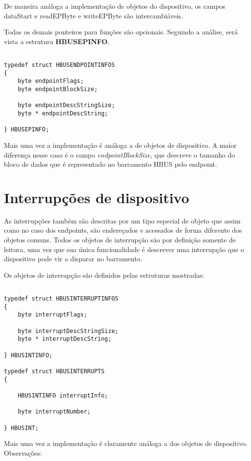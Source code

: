De maneira análoga a implementação de objetos do dispositivo, os campos dataStart e readEPByte e writeEPByte são intercambiáveis.

Todas os demais ponteiros para funções são opcionais. Seguindo a análise, será vista a estrutura \textbf{HBUSEPINFO}.

\begin{verbatim}

typedef struct HBUSENDPOINTINFOS
{
	byte endpointFlags;
	byte endpointBlockSize;
	
	byte endpointDescStringSize;
	byte * endpointDescString;
	
} HBUSEPINFO;

\end{verbatim}

Mais uma vez a implementação é análoga a de objetos de dispositivo. A maior diferença nesse caso é o campo \textit{endpointBlockSize}, que descreve o tamanho do bloco de dados que é representado no barramento HBUS pelo endpoint.

\section{Interrupções de dispositivo}

As interrupções também são descritas por um tipo especial de objeto que assim como no caso dos endpoints, são endereçados e acessados de forma diferente dos objetos comuns. Todos os objetos de interrupção são por definição somente de leitura, uma vez que sua única funcionalidade é descrever uma interrupção que o dispositivo pode vir a disparar no barramento.

Os objetos de interrupção são definidos pelas estruturas mostradas:

\begin{verbatim}

typedef struct HBUSINTERRUPTINFOS
{
	byte interruptFlags;
	
	byte interruptDescStringSize;
	byte * interruptDescString;
	
} HBUSINTINFO;

typedef struct HBUSINTERRUPTS
{
	
	HBUSINTINFO interruptInfo;
	
	byte interruptNumber;
	
} HBUSINT;

\end{verbatim}

Mais uma vez a implementação é claramente análoga a dos objetos de dispositivo. Observações:


